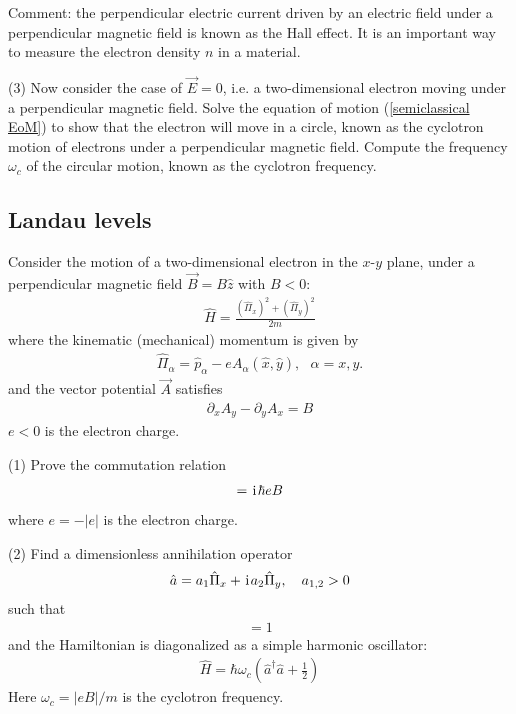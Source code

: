 Comment: the perpendicular electric current driven by an electric field under a perpendicular magnetic field is known as the Hall effect. It is an important way to measure the electron density $n$ in a material. 

(3) Now consider the case of $\vec E=0$, i.e. a two-dimensional electron moving under a perpendicular magnetic field. Solve the equation of motion (\ref{semiclassical EoM}) to show that the electron will move in a circle, known as the cyclotron motion of electrons under a perpendicular magnetic field. Compute the frequency $\omega_c$ of the circular motion, known as the cyclotron frequency.

\subsection{Landau levels}

Consider the motion of a two-dimensional electron in the $x$-$y$ plane, under a perpendicular magnetic field $\vec B=B\hat z$ with $B<0$:
\begin{align}
\hat H=\frac{(\hat\Pi_x)^2+(\hat\Pi_y)^2}{2m}
\end{align}
where the kinematic (mechanical) momentum is given by
\begin{align}
\hat\Pi_\alpha=\hat p_\alpha-eA_\alpha(\hat x,\hat y),~~~\alpha=x,y.
\end{align}
and the vector potential $\vec A$ satisfies
\begin{align}
\partial_xA_y-\partial_yA_x=B
\end{align}
$e<0$ is the electron charge. 

(1) Prove the commutation relation
\begin{align}
[\Pi_x,\Pi_y]=\imth\hbar eB
\end{align}
where $e=-|e|$ is the electron charge. 

(2) Find a dimensionless annihilation operator
\begin{align}
\hat a=a_1\hat \Pi_x+\hspace{1pt}\mathrm{i}\hspace{1pt} a_2\hat \Pi_y,~~~a_{1,2}>0
\end{align}
such that
\begin{align}
[\hat a,\hat a^\dagger]=1
\end{align}
and the Hamiltonian is diagonalized as a simple harmonic oscillator:
\begin{align}
\hat H=\hbar\omega_c(\hat a^\dagger \hat a+\frac12)
\end{align}
Here $\omega_c=|eB|/m$ is the cyclotron frequency. 

